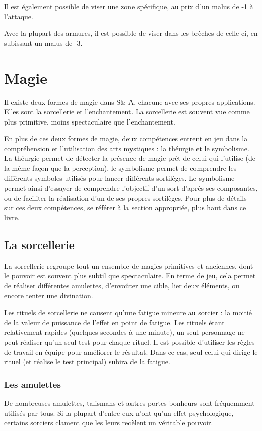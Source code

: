 \documentclass[10pt,a4paper,twocolumn]{book}
\begin{document}
Il est également possible de viser une zone spécifique, au prix d’un malus de -1 à l’attaque.

Avec la plupart des armures, il est possible de viser dans les brèches de celle-ci, en subissant un malus de -3.

\section{Magie}
Il existe deux formes de magie dans S\& A, chacune avec ses propres applications. Elles sont la sorcellerie et l'enchantement. La sorcellerie est souvent vue comme plus primitive, moins spectaculaire que l'enchantement.

En plus de ces deux formes de magie, deux compétences entrent en jeu dans la compréhension et l'utilisation des arts mystiques : la théurgie et le symbolisme. La théurgie permet de détecter la présence de magie prêt de celui qui l'utilise (de la même façon que la perception), le symbolisme permet de comprendre les différents symboles utilisés pour lancer différents sortilèges. Le symbolisme permet ainsi d'essayer de comprendre l'objectif d'un sort d'après ses composantes, ou de faciliter la réalisation d'un de ses propres sortilèges. Pour plus de détails sur ces deux compétences, se référer à la section appropriée, plus haut dans ce livre.

\subsection{La sorcellerie}
La sorcellerie regroupe tout un ensemble de magies primitives et anciennes, dont le pouvoir est souvent plus subtil que spectaculaire. En terme de jeu, cela permet de réaliser différentes amulettes, d'envoûter une cible, lier deux éléments, ou encore tenter une divination.

Les rituels de sorcellerie ne causent qu'une fatigue mineure au  sorcier : la moitié de la valeur de puissance de l'effet en point de fatigue.
Les rituels étant relativement rapides (quelques secondes à une minute), un seul personnage ne peut réaliser qu'un seul test pour chaque rituel. Il est possible d'utiliser les règles de travail en équipe pour améliorer le résultat. Dans ce cas, seul celui qui dirige le rituel (et réalise le test principal) subira de la fatigue.
\subsubsection{Les amulettes}
De nombreuses amulettes, talismans et autres portes-bonheurs sont fréquemment utilisés par tous. Si la plupart d'entre eux n'ont qu'un effet psychologique, certains sorciers clament que les leurs recèlent un véritable pouvoir.
\end{document}
